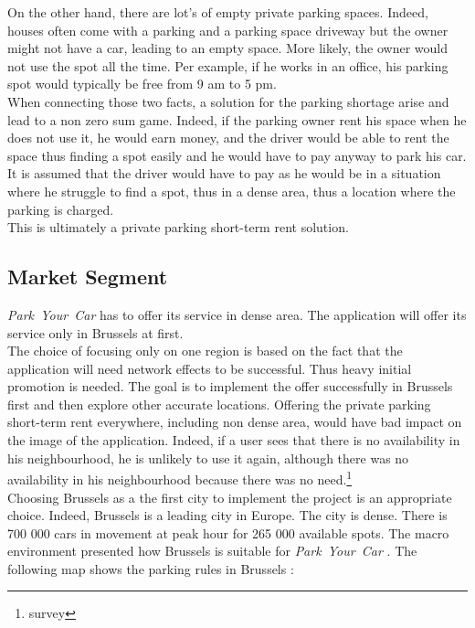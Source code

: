 \documentclass[12pt,a4paper,oneside]{book}
\newcommand{\bp}{\textit{Park~Your~Car }}
\begin{document}
On the other hand, there are lot's of empty private parking spaces. Indeed, houses often come with a parking and a parking space driveway but the owner might not have a car, leading to an empty space. More likely, the owner would not use the spot all the time. Per example, if he works in an office, his parking spot would typically be free from 9 am to 5 pm.\\

When connecting those two facts, a solution for the parking shortage arise and lead to a non zero sum game. Indeed, if the parking owner rent his space when he does not use it, he would earn money, and the driver would be able to rent the space thus finding a spot easily and he would have to pay anyway to park his car. It is assumed that the driver would have to pay as he would be in a situation where he struggle to find a spot, thus in a dense area, thus a location where the parking is charged.\\

This is ultimately a private parking short-term rent solution.

\subsection{Market Segment}
\bp has to offer its service in dense area. The application will offer its service only in Brussels at first.\\

The choice of focusing only on one region is based on the fact that the application will need network effects to be successful. Thus heavy initial promotion is needed. The goal is to implement the offer successfully in Brussels first and then explore other accurate locations. Offering the private parking short-term rent everywhere, including non dense area, would have bad impact on the image of the application. Indeed, if a user sees that there is no availability in his neighbourhood, he is unlikely to use it again, although there was no availability in his neighbourhood because there was no need.\footnote{survey} \\

Choosing Brussels as a the first city to implement the project is an appropriate choice. Indeed, Brussels is a leading city in Europe. The city is dense. There is 700 000 cars in movement at peak hour for 265 000 available spots.\cite{parkbx} The macro environment presented how Brussels is suitable for \bp. The following map shows the parking rules in Brussels\cite{parkbx} : \\
\end{document}
